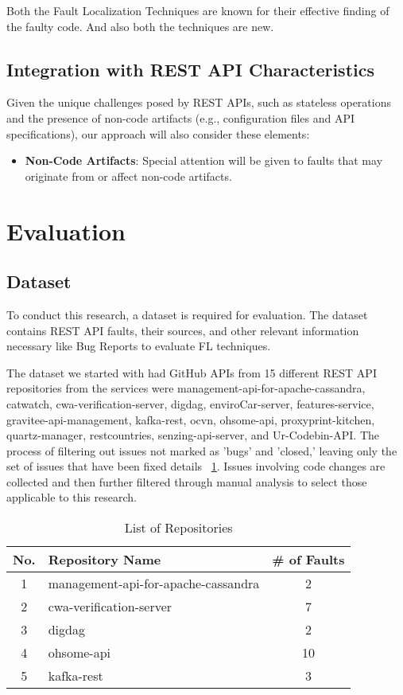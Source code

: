 \documentclass[conference]{IEEEtran}
\begin{document}
Both the Fault Localization Techniques are known for their effective finding of the faulty code. And also both the techniques are new.

\subsection{Integration with REST API Characteristics}

Given the unique challenges posed by REST APIs, such as stateless operations and the presence of non-code artifacts (e.g., configuration files and API specifications), our approach will also consider these elements:
\begin{itemize}
    \item \textbf{Non-Code Artifacts}: Special attention will be given to faults that may originate from or affect non-code artifacts. 
\end{itemize}


\section{Evaluation}
\label{sec:evaluation}

\subsection{Dataset}
\label{sec:dataset}

To conduct this research, a dataset is required for evaluation. The dataset contains REST API faults, their sources, and other relevant information necessary like Bug Reports to evaluate FL techniques.

The dataset we started with had  GitHub APIs from 15 different REST API repositories from 
the services were management-api-for-apache-cassandra, catwatch, cwa-verification-server, digdag, enviroCar-server, features-service,
gravitee-api-management, kafka-rest, ocvn, ohsome-api, proxyprint-kitchen, quartz-manager, restcountries, senzing-api-server, and Ur-Codebin-API.
The  process of filtering out issues not marked as 'bugs' and 'closed,' leaving only the set of issues that have been fixed details ~\ref{tab:repositories}. Issues involving code changes are collected and then further filtered through manual analysis to select those applicable to this research.

\begin{table}
    \centering
    \caption{List of Repositories}
    \label{tab:repositories}
    \begin{tabular}{|c|l|c|}
    \hline
        \hline
        \textbf{No.} & \textbf{Repository Name} & \textbf{\# of Faults} \\ \hline
        1 & management-api-for-apache-cassandra & 2 \\ \hline
        2 & cwa-verification-server &  7 \\ \hline
        3 & digdag & 2 \\ \hline
        4 & ohsome-api & 10 \\ \hline
        5 & kafka-rest & 3 \\ \hline
    \end{tabular}
\end{table}
    
\end{document}
